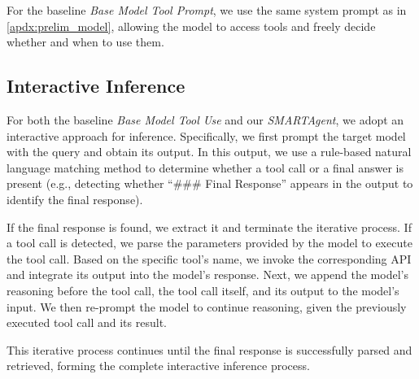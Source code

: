 For the baseline \textit{Base Model Tool Prompt}, we use the same system prompt as in \cref{apdx:prelim_model}, allowing the model to access tools and freely decide whether and when to use them.

\subsection{Interactive Inference}
\label{apdx:inference}
For both the baseline \textit{Base Model Tool Use} and our \textit{SMARTAgent}, we adopt an interactive approach for inference. Specifically, we first prompt the target model with the query and obtain its output. In this output, we use a rule-based natural language matching method to determine whether a tool call or a final answer is present (e.g., detecting whether ``\#\#\# Final Response'' appears in the output to identify the final response).  

If the final response is found, we extract it and terminate the iterative process. If a tool call is detected, we parse the parameters provided by the model to execute the tool call. Based on the specific tool's name, we invoke the corresponding API and integrate its output into the model's response. Next, we append the model's reasoning before the tool call, the tool call itself, and its output to the model's input. We then re-prompt the model to continue reasoning, given the previously executed tool call and its result.  

This iterative process continues until the final response is successfully parsed and retrieved, forming the complete interactive inference process.  

